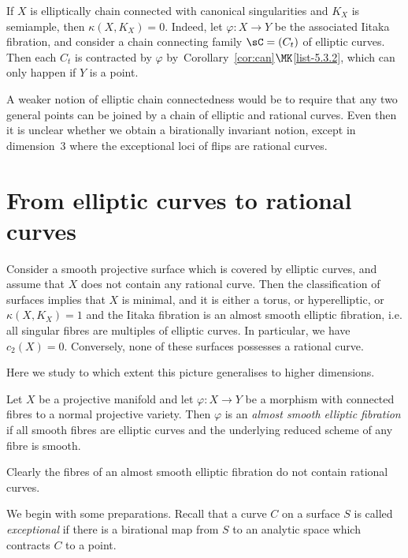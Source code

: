 \goodbreak
\begin{rema}\label{rem3}
If $X$ is elliptically chain connected with canonical singularities and $K_X$ is semiample, then $\kappa (X,K_X) = 0$. Indeed, let $\varphi\colon X \to Y$ be the associated Iitaka fibration, and consider a chain connecting family $\sC = (C_t)$ of elliptic curves. Then each $C_t$ is contracted by $\varphi$ by~Corollary~\ref{cor:can}$\MK$\eqref{list-5.3.2}, which can only happen if $Y$ is a point.
\end{rema}

\begin{rema}\label{rema:main5.7}
A weaker notion of elliptic chain connectedness would be to require that any two general points can be joined by a chain of elliptic and rational curves. Even then it is unclear whether we obtain a birationally invariant notion, except in dimension~$3$ where the exceptional loci of flips are rational curves.
\end{rema}

\section{From elliptic curves to rational curves} \label{sec:elltorat}

Consider a smooth projective surface which is covered by elliptic curves, and assume that $X$ does not contain any rational curve. Then the classification of surfaces implies that $X$ is minimal, and it is either a torus, or hyperelliptic, or $\kappa (X,K_X) = 1$ and the Iitaka fibration is an almost smooth elliptic fibration, i.e. all singular fibres are multiples of elliptic curves. In particular, we have $c_2(X) = 0$. Conversely, none of these surfaces possesses a rational curve.

Here we study to which extent this picture generalises to higher dimensions.

\begin{defi}\label{defi:main6.1}
Let $X$ be a projective manifold and let $\varphi\colon X \to Y$ be a morphism with connected fibres to a normal projective variety. Then $\varphi$ is an \emph{almost smooth elliptic fibration} if all smooth fibres are elliptic curves and the underlying reduced scheme of any fibre is smooth.
\end{defi}

Clearly the fibres of an almost smooth elliptic fibration do not contain rational curves.

We begin with some preparations. Recall that a curve $C$ on a surface $S$ is called \emph{exceptional} if there is a birational map from $S$ to an analytic space which contracts $C$ to a point.

